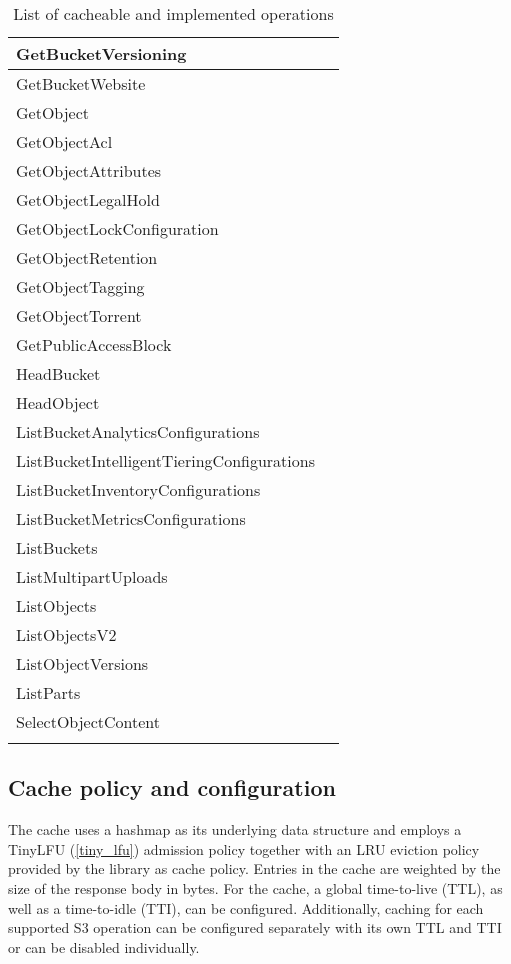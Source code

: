 \begin{table}[H]
\begin{center}
\begin{longtable}{| l | l |}
			GetBucketVersioning & \xmark \\ \hline
			GetBucketWebsite & \xmark \\ \hline
			GetObject & \cmark \\ \hline
			GetObjectAcl & \xmark \\ \hline
			GetObjectAttributes & \xmark \\ \hline
			GetObjectLegalHold & \xmark \\ \hline
			GetObjectLockConfiguration & \xmark \\ \hline
			GetObjectRetention & \xmark \\ \hline
			GetObjectTagging & \xmark \\ \hline
			GetObjectTorrent & \xmark \\ \hline
			GetPublicAccessBlock & \xmark \\ \hline
			HeadBucket & \cmark \\ \hline
			HeadObject & \cmark \\ \hline
			ListBucketAnalyticsConfigurations & \xmark \\ \hline
			ListBucketIntelligentTieringConfigurations & \xmark \\ \hline
			ListBucketInventoryConfigurations & \xmark \\ \hline
			ListBucketMetricsConfigurations & \xmark \\ \hline
			ListBuckets & \cmark \\ \hline
			ListMultipartUploads & \xmark \\ \hline
			ListObjects & \cmark \\ \hline
			ListObjectsV2 & \cmark \\ \hline
			ListObjectVersions & \cmark \\ \hline
			ListParts & \xmark \\ \hline
			SelectObjectContent & \xmark \\ \hline
			
			\caption{List of cacheable and implemented operations}
		\end{longtable}
	\end{center}
	\label{table_cached_operations}
\end{table}

\subsection{Cache policy and configuration}

The cache uses a hashmap as its underlying data structure and employs a TinyLFU (\ref{tiny_lfu}) admission policy together with an LRU eviction policy provided by the \cite{MOKA_GITHUB} library as cache policy. Entries in the cache are weighted by the size of the response body in bytes. For the cache, a global time-to-live (TTL), as well as a time-to-idle (TTI), can be configured. Additionally, caching for each supported S3 operation can be configured separately with its own TTL and TTI or can be disabled individually.

